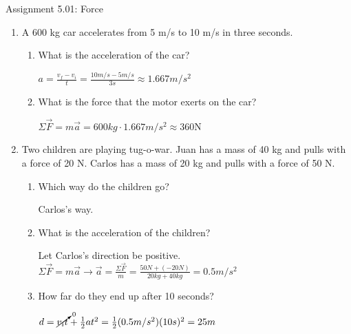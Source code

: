 \documentclass[letterpaper, 12pt]{article}
\begin{document}


\begin{center} Assignment 5.01: Force
\end{center}
\vspace{-.3in}
\begin{enumerate}
\item A 600 kg car accelerates from 5 m/s to 10 m/s in three seconds.
\begin{enumerate}
	\item What is the acceleration of the car?
	
	\color{red}
	$a = \frac{v_f-v_i}{t} = \frac{10 m/s - 5 m/s} {3 s} \approx 1.667 m/s^2$
	
	\color{black}

	\item What is the force that the motor exerts on the car?
	
	\color{red}
	$\Sigma \vec{F} = m\vec{a} = 600kg \cdot 1.667 m/s^2 \approx 360$N
	\color{black}


\end{enumerate}

\item Two children are playing tug-o-war.  Juan has a mass of 40 kg and pulls with a force of 20 N. Carlos has a mass of 20 kg and pulls with a force of 50 N.  
\begin{enumerate}
	\item Which way do the children go?

		\color{red}
	Carlos's way.
	\color{black}

	\item What is the acceleration of the children?

		\color{red}
	Let Carlos's direction be positive. 
	$\Sigma \vec{F} = m\vec{a} \longrightarrow \vec{a} = \frac{\Sigma \vec{F}}{m} = \frac{50N + (-20N)} {20kg + 40kg} = 0.5 m/s^2$
	\color{black}

	\item How far do they end up after 10 seconds?  
	
	\color{red}
		$d = \cancelto{0}{v_i t} + \frac{1}{2}at^2 = \frac{1}{2}(0.5m/s^2)(10s)^2 = 25 m$
	\color{black}
\end{enumerate}


\end{enumerate}
\end{document}
